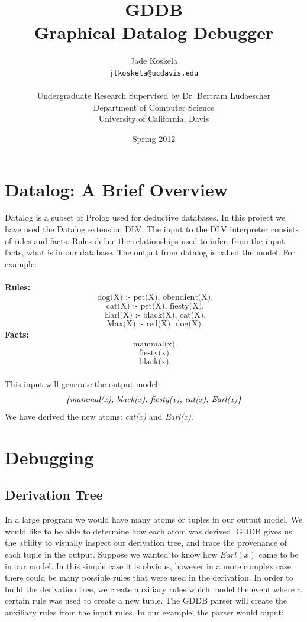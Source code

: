 \documentclass[12pt]{report}
\begin{document}
\begin{titlepage}
\title{GDDB \\ Graphical Datalog Debugger}
\author{Jade Koskela\\ \texttt{jtkoskela@ucdavis.edu} \\ \\
Undergraduate Research Supervised by Dr. Bertram Ludaescher\\
Department of Computer Science\\
University of California, Davis
}
\date{Spring 2012}
\maketitle
\end{titlepage}
\section*{Datalog: A Brief Overview}
Datalog is a subset of Prolog used for deductive databases. In this project we have used the Datalog extension DLV. The input to the DLV interpreter consists of rules and facts. Rules define the relationships used to infer, from the input facts, what is in our database. The output from datalog is called the model. For example:  \\
\\
\textbf{Rules:}
\[\text{ dog(X) :- pet(X), obendient(X).} \]
\[\text{ cat(X) :- pet(X), fiesty(X).} \]
\[\text{ Earl(X) :- black(X), cat(X).} \]
\[\text{ Max(X) :- red(X), dog(X).} \] 
\textbf{Facts:} \\
\[\text{ mammal(x).} \]
\[\text{ fiesty(x).} \]
\[\text{ black(x).} \]
\\
This input will generate the output model:\\ \[\emph{\{mammal(x), black(x), fiesty(x), cat(x), Earl(x)\}} \] We have derived the new atoms: \emph{cat(x)} and \emph{Earl(x)}. 

\section*{Debugging}

\subsection*{Derivation Tree}
In a large program we would have many atoms or tuples in our output model. We would like to be able to determine how each atom was derived. GDDB gives us the ability to visually inspect our derivation tree, and trace the provenance of each tuple in the output. Suppose we wanted to know how $Earl(x)$ came to be in our model. In this simple case it is obvious, however in a more complex case there could be many possible rules that were used in the derivation. In order to build the derivation tree, we create auxiliary rules which model the event where a certain rule was used to create a new tuple. The GDDB parser will create the auxiliary rules from the input rules. In our example, the parser would ouput:
\end{document}

